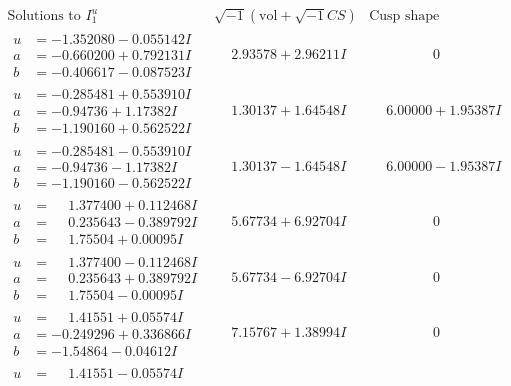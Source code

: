 \documentclass[1p]{elsarticle_modified}
\theoremstyle{definition}
\newcommand{\I}{\sqrt{-1}}
\begin{document}
$$\begin{array}{c|c|c}
\text{Solutions to }I^u_{1}& \I (\text{vol} + \sqrt{-1}CS) & \text{Cusp shape}\\
 \hline 
\begin{aligned}
u &= -1.352080 - 0.055142 I \\
a &= -0.660200 + 0.792131 I \\
b &= -0.406617 - 0.087523 I\end{aligned}
 & \phantom{-}2.93578 + 2.96211 I & \phantom{-0.000000 } 0 \\ \hline\begin{aligned}
u &= -0.285481 + 0.553910 I \\
a &= -0.94736 + 1.17382 I \\
b &= -1.190160 + 0.562522 I\end{aligned}
 & \phantom{-}1.30137 + 1.64548 I & \phantom{-}6.00000 + 1.95387 I \\ \hline\begin{aligned}
u &= -0.285481 - 0.553910 I \\
a &= -0.94736 - 1.17382 I \\
b &= -1.190160 - 0.562522 I\end{aligned}
 & \phantom{-}1.30137 - 1.64548 I & \phantom{-}6.00000 - 1.95387 I \\ \hline\begin{aligned}
u &= \phantom{-}1.377400 + 0.112468 I \\
a &= \phantom{-}0.235643 - 0.389792 I \\
b &= \phantom{-}1.75504 + 0.00095 I\end{aligned}
 & \phantom{-}5.67734 + 6.92704 I & \phantom{-0.000000 } 0 \\ \hline\begin{aligned}
u &= \phantom{-}1.377400 - 0.112468 I \\
a &= \phantom{-}0.235643 + 0.389792 I \\
b &= \phantom{-}1.75504 - 0.00095 I\end{aligned}
 & \phantom{-}5.67734 - 6.92704 I & \phantom{-0.000000 } 0 \\ \hline\begin{aligned}
u &= \phantom{-}1.41551 + 0.05574 I \\
a &= -0.249296 + 0.336866 I \\
b &= -1.54864 - 0.04612 I\end{aligned}
 & \phantom{-}7.15767 + 1.38994 I & \phantom{-0.000000 } 0 \\ \hline\begin{aligned}
u &= \phantom{-}1.41551 - 0.05574 I \\

\end{aligned}
\end{array}$$
\end{document}
